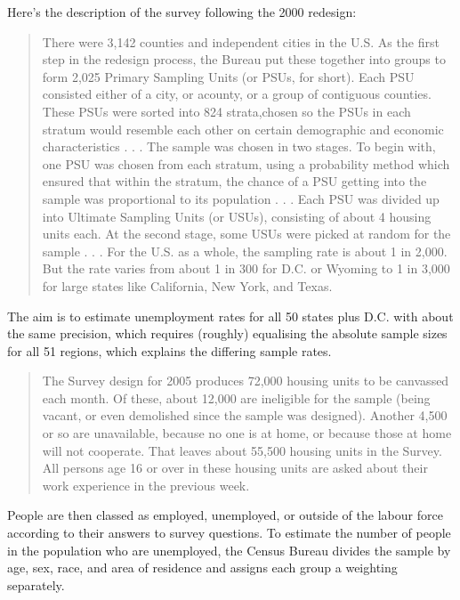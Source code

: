 \documentclass[
]{book}
\begin{document}
Here's the description of the survey following the 2000 redesign:

\begin{quote}
There were 3,142 counties and independent cities in the U.S. As the first step in the redesign process, the Bureau put these together into groups to form 2,025 Primary Sampling Units (or PSUs, for short). Each PSU consisted either of a city, or acounty, or a group of contiguous counties. These PSUs were sorted into 824 strata,chosen so the PSUs in each stratum would resemble each other on certain demographic and economic characteristics . . . The sample was chosen in two stages. To begin with, one PSU was chosen from each stratum, using a probability method which ensured that within the stratum, the chance of a PSU getting into the sample was proportional to its population . . . Each PSU was divided up into Ultimate Sampling Units (or USUs), consisting of about 4 housing units each. At the second stage, some USUs were picked at random for the sample . . . For the U.S. as a whole, the sampling rate is about 1 in 2,000. But the rate varies from about 1 in 300 for D.C. or Wyoming to 1 in 3,000 for large states like California, New York, and Texas.
\end{quote}

The aim is to estimate unemployment rates for all 50 states plus D.C. with about the same precision, which requires (roughly) equalising the absolute sample sizes for all 51 regions, which explains the differing sample rates.

\begin{quote}
The Survey design for 2005 produces 72,000 housing units to be canvassed each month. Of these, about 12,000 are ineligible for the sample (being vacant, or even demolished since the sample was designed). Another 4,500 or so are unavailable, because no one is at home, or because those at home will not cooperate. That leaves about 55,500 housing units in the Survey. All persons age 16 or over in these housing units are asked about their work experience in the previous week.
\end{quote}

People are then classed as employed, unemployed, or outside of the labour force according to their answers to survey questions. To estimate the number of people in the population who are unemployed, the Census Bureau divides the sample by age, sex, race, and area of residence and assigns each group a weighting separately.
\end{document}
